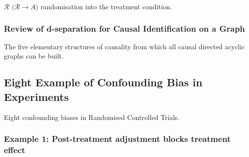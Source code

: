 \documentclass[
  single column]{article}
\begin{document}
\textbf{\(\mathbf{\mathcal{R}}\)}
\(\big(\mathcal{R} \rightarrow A\big)\) randomisation into the treatment
condition.

\subsubsection{Review of d-separation for Causal Identification on a
Graph}\label{review-of-d-separation-for-causal-identification-on-a-graph}

\begin{table}

\caption{\label{tbl-fiveelementary}The five elementary structures of
causality from which all causal directed acyclic graphs can be built.}

\centering{

\terminologydirectedgraph

}

\end{table}%

\subsection{Eight Example of Confounding Bias in
Experiments}\label{eight-example-of-confounding-bias-in-experiments}

\begin{table}

\caption{\label{tbl-terminologyelconfoundersexperiments}Eight
confounding biases in Randomised Controlled Trials.}

\centering{

\terminologyelconfoundersexperiments

}

\end{table}%

\subsubsection{Example 1: Post-treatment adjustment blocks treatment
effect}\label{example-1-post-treatment-adjustment-blocks-treatment-effect}
\end{document}
